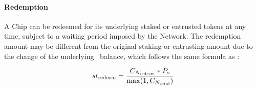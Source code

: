 \paragraph{Redemption}
A Chip can be redeemed for its underlying staked or entrusted tokens at any time, subject to a waiting period imposed by the Network.
The redemption amount may be different from the original staking or entrusting amount due to the change of the underlying \stakingPool\ balance, which follows the same formula as :

\begin{equation}
    \label{eq:chip_redeem}
    st_{\text{redeem}} = 
    \frac{C_{N_\text{redeem}} * P_{s}}{\max(1, C_{N_\text{total}})}
\end{equation}







